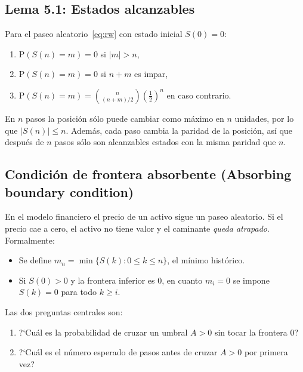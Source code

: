 \documentclass[12pt]{article}
\begin{document}
\subsection{Lema 5.1: Estados alcanzables}

\begin{tcolorbox}[colback=gray!5, colframe=gray!50, title=\textbf{Lema~5.1}]
Para el paseo aleatorio~\eqref{eq:rw} con estado inicial $S(0)=0$:
\begin{enumerate}
  \item $\mathrm{P}(S(n)=m)=0$ si $|m|>n$,
  \item $\mathrm{P}(S(n)=m)=0$ si $n+m$ es impar,
  \item $\mathrm{P}(S(n)=m)=\displaystyle\binom{n}{(n+m)/2}\!\left(\frac{1}{2}\right)^{\!n}$
        en caso contrario.
\end{enumerate}
\end{tcolorbox}

\begin{intuicion}
En $n$ pasos la posici\'on s\'olo puede cambiar como m\'aximo en $n$ unidades,
por lo que $|S(n)| \leq n$. Adem\'as, cada paso cambia la paridad de la posici\'on,
as\'i que despu\'es de $n$ pasos s\'olo son alcanzables estados con la misma paridad
que $n$.
\end{intuicion}

\subsection{Condici\'on de frontera absorbente (Absorbing boundary condition)}

En el modelo financiero el precio de un activo sigue un paseo aleatorio.
Si el precio cae a cero, el activo no tiene valor y el caminante \emph{queda atrapado}.
Formalmente:

\begin{itemize}
  \item Se define $m_n = \min\{S(k) : 0 \leq k \leq n\}$, el m\'inimo hist\'orico.
  \item Si $S(0) > 0$ y la frontera inferior es $0$, en cuanto $m_i = 0$ se
        impone $S(k) = 0$ para todo $k \geq i$.
\end{itemize}

Las dos preguntas centrales son:
\begin{enumerate}
  \item ?`Cu\'al es la probabilidad de cruzar un umbral $A > 0$ sin tocar la frontera $0$?
  \item ?`Cu\'al es el n\'umero esperado de pasos antes de cruzar $A > 0$
        por primera vez?
\end{enumerate}
\end{document}
